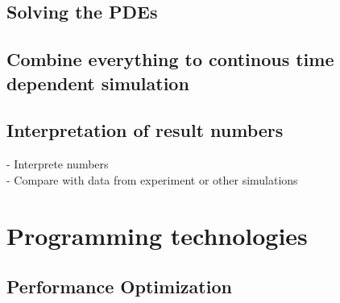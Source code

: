 \documentclass[parskip=half, titlepage=yes, 12pt, BCOR=12mm, DIV=calc]{scrartcl}
\begin{document}
\subsection{Solving the PDEs}
\subsection{Combine everything to continous time dependent simulation}
\subsection{Interpretation of result numbers}
- Interprete numbers \\
- Compare with data from experiment or other simulations \\

\section{Programming technologies}

\subsection{Performance Optimization}
\end{document}
